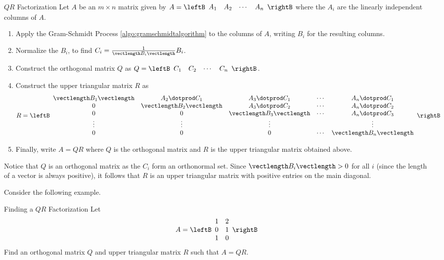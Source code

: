 \begin{procedure}{$QR$ Factorization}\label{proc:qrfactorization}
Let $A$ be an $m \times n$ matrix given by $A = \leftB 
\begin{array}{cccc}
A_1 & A_2 & \cdots & A_n 
\end{array}
\rightB$ where the $A_i$ are the linearly independent columns of $A$. 
\begin{enumerate}
\item
Apply the Gram-Schmidt Process \ref{algo:gramschmidtalgorithm} to the columns of $A$, writing $B_i$ for the resulting columns.

\item
Normalize the $B_i$, to find $C_i = \frac{1}{\vectlength B_i \vectlength} B_i$. 

\item
Construct the orthogonal matrix $Q$ as $Q=\leftB 
\begin{array}{cccc}
C_1 & C_2 & \cdots & C_n 
\end{array}
\rightB$. 

\item 
Construct the upper triangular matrix $R$ as 
\[ R = 
\leftB
\begin{array}{ccccc}
\vectlength B_1 \vectlength & A_2 \dotprod C_1 & A_3 \dotprod C_1 & \cdots & A_n \dotprod C_1 \\
0 & \vectlength B_2 \vectlength & A_3 \dotprod C_2 & \cdots & A_n \dotprod C_2 \\
0 & 0 & \vectlength B_3 \vectlength & \cdots & A_n \dotprod C_3 \\
\vdots & \vdots & \vdots & & \vdots \\
0 & 0 & 0 & \cdots & \vectlength B_n \vectlength 
\end{array}
\rightB
\]

\item
Finally, write $A=QR$ where $Q$ is the orthogonal matrix and $R$ is the upper triangular matrix obtained above. 
\end{enumerate} 
\end{procedure}

Notice that $Q$ is an orthogonal matrix as the $C_i$ form an orthonormal set. Since $\vectlength B_i \vectlength > 0$ for all $i$ (since the length of a vector is always positive), it follows that $R$ is an upper triangular matrix with positive entries on the main diagonal. 

Consider the following example.

\begin{example}{Finding a $QR$ Factorization}\label{exa:qrfactorization}
Let \[
A = \leftB \begin{array}{rr}
1 & 2 \\
0 & 1 \\
1 & 0 
\end{array} \rightB
\]
Find an orthogonal matrix $Q$ and upper triangular matrix $R$ such that $A=QR$. 
\end{example}

